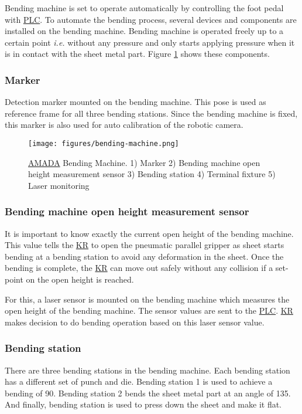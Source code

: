 Bending machine is set to operate automatically by controlling the foot pedal with \hyperref[acro:PLC]{PLC}.
To automate the bending process, several devices and components are installed on the bending machine.
Bending machine is operated freely up to a certain point \textit{i.e.} without any pressure and only starts
applying pressure when it is in contact with the sheet metal part.
Figure \ref{fig:bending_machine} shows these components.


\subsubsection{Marker}
\label{subsubsec:marker}
Detection marker mounted on the bending machine. This pose is used as reference frame for all three bending stations.
Since the bending machine is fixed, this marker is also used for auto calibration of the robotic camera.


\begin{figure}[h]
    \centering
    \texttt{[image: figures/bending-machine.png]}
    \caption{\hyperref[acro:AMADA]{AMADA} Bending Machine. 1) Marker  2) Bending machine open height measurement sensor 3) Bending station 4) Terminal fixture 5) Laser monitoring}
    \label{fig:bending_machine}
\end{figure}

\subsubsection{Bending machine open height measurement sensor}
\label{subsubsec:laser-sensor}

It is important to know exactly the current open height of the bending machine.
This value tells the \hyperref[acro:KR]{KR} to open the pneumatic parallel gripper as sheet starts bending at a bending station to avoid any deformation in the sheet.
Once the bending is complete, the \hyperref[acro:KR]{KR} can move out safely without any collision if a set-point on the open height is reached.

For this, a laser sensor is mounted on the bending machine which measures the open height of the bending machine.
The sensor values are sent to the \hyperref[acro:PLC]{PLC}. \hyperref[acro:KR]{KR} makes decision to do bending operation based on this laser sensor value.


\subsubsection{Bending station}
\label{subsubsec:bending-station}
There are three bending stations in the bending machine. Each bending station has a different set of punch and die.
Bending station 1 is used to achieve a bending of 90\textdegree. Bending station 2 bends the sheet metal part at an angle of 135\textdegree.
And finally, bending station is used to press down the sheet and make it flat.

